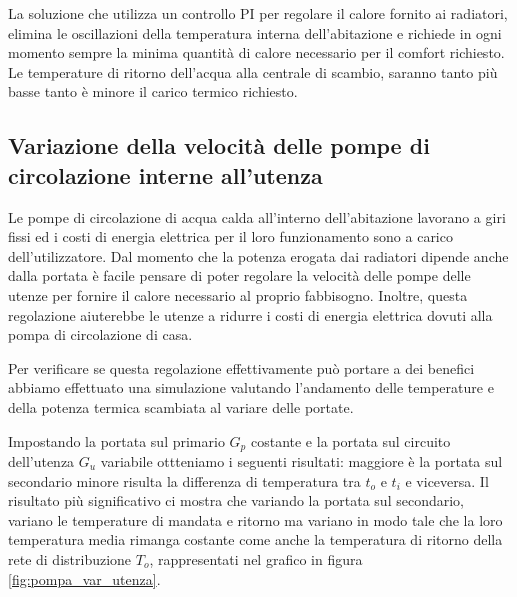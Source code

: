 \documentclass[laurea,oneside,11pt]{USiena_tesiLM}
\begin{document}

La soluzione che utilizza un controllo PI per regolare il calore fornito ai radiatori, elimina le oscillazioni della temperatura interna dell'abitazione e richiede in ogni momento sempre la minima quantità di calore necessario per il comfort richiesto. Le temperature di ritorno dell'acqua alla centrale di scambio, saranno tanto più basse tanto è minore il carico termico richiesto. 

\subsection{Variazione della velocità delle pompe di circolazione interne all'utenza}


Le pompe di circolazione di acqua calda all'interno dell'abitazione lavorano a giri fissi ed i costi di energia elettrica per il loro funzionamento sono a carico dell'utilizzatore. Dal momento che la potenza erogata dai radiatori dipende anche dalla portata è facile pensare di poter  regolare la velocità delle pompe delle utenze per fornire il calore necessario al proprio fabbisogno. Inoltre, questa regolazione aiuterebbe le utenze a ridurre i costi di energia elettrica dovuti alla pompa di circolazione di casa.

Per verificare se questa regolazione effettivamente può portare a dei benefici abbiamo effettuato una simulazione valutando  l’andamento delle temperature e della potenza termica scambiata al variare delle portate.

Impostando la portata sul primario $G_p$ costante e la portata sul circuito dell'utenza $G_u$ variabile ottteniamo i seguenti risultati:
maggiore è la portata sul secondario minore risulta la differenza di temperatura tra $t_o$ e $t_i$ e viceversa. Il risultato più significativo ci mostra che variando la portata sul secondario, variano le temperature di mandata e ritorno ma variano in
modo tale che la loro temperatura media rimanga costante come anche la temperatura di ritorno della rete di distribuzione $T_o$, rappresentati nel grafico in figura \ref{fig:pompa_var_utenza}.
\end{document}

